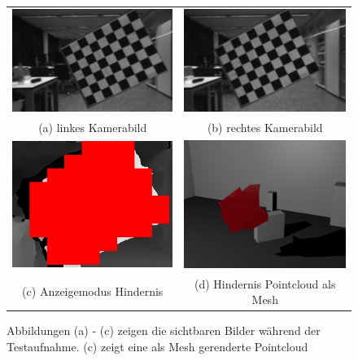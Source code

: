 \begin{figure}[h]
	\centering
	\begin{tabular}{cc}
	\includegraphics[width=5.5cm]{img/evaluation/test_set/_test_3_left}&
	\includegraphics[width=5.5cm]{img/evaluation/test_set/_test_3_right}\\
	(a) linkes Kamerabild & (b) rechtes Kamerabild\\
	\includegraphics[width=5.5cm]{img/evaluation/test_set/_test_3_disparity}&
    \includegraphics[width=5.5cm]{img/evaluation/test_set/rendered_obstacle}\\
	(c) Anzeigemodus Hindernis & (d) Hindernis Pointcloud als Mesh
	\end{tabular}
	\caption{Abbildungen (a) - (c) zeigen die sichtbaren Bilder während der Testaufnahme. (c) zeigt eine als Mesh gerenderte Pointcloud}
	\label{fig:test_viewing}
\end{figure}


